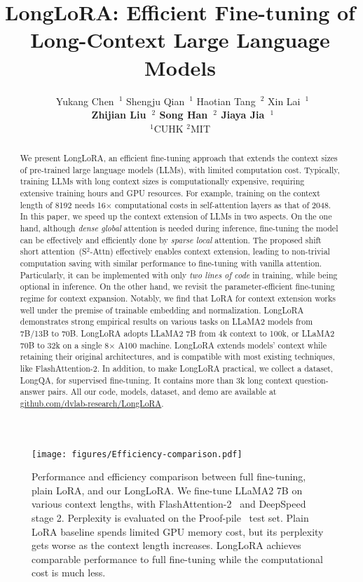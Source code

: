 \documentclass{article} %
\title{LongLoRA: Efficient Fine-tuning of Long-Context Large Language Models}
\author{%
\qquad \qquad $\,$ Yukang Chen~$^{1}$\qquad
Shengju Qian~$^{1}$\qquad
Haotian Tang~$^{2}$\qquad
Xin Lai~$^{1}$\qquad \qquad
\\[0.1cm]
\textbf{%
\qquad \qquad \, Zhijian Liu~$^{2}$\qquad
Song Han~$^{2}$\qquad
Jiaya Jia~$^{1}$
}
\\[0.2cm]
\qquad $^1$CUHK\qquad
$^2$MIT\qquad
}
\begin{document}
\maketitle
\begin{abstract}
We present LongLoRA, an efficient fine-tuning approach that extends the context sizes of pre-trained large language models (LLMs), with limited computation cost.
Typically, training LLMs with long context sizes is computationally expensive, requiring extensive training hours and GPU resources. For example, training on the context length of 8192 needs 16$\times$ computational costs in self-attention layers as that of 2048.
In this paper, we speed up the context extension of LLMs in two aspects. On the one hand, although \textit{dense global} attention is needed during inference, fine-tuning the model can be effectively and efficiently done by \textit{sparse local} attention. The proposed shift short attention~(S$^2$-Attn) effectively enables context extension, leading to non-trivial computation saving with similar performance to fine-tuning with vanilla attention. Particularly, it can be implemented with only \textit{two lines of code} in training, while being optional in inference. On the other hand, we revisit the parameter-efficient fine-tuning regime for context expansion. Notably, we find that LoRA for context extension works well under the premise of trainable embedding and normalization. LongLoRA demonstrates strong empirical results on various tasks on LLaMA2 models from 7B/13B to 70B. LongLoRA adopts LLaMA2 7B from 4k context to 100k, or LLaMA2 70B to 32k on a single 8$\times$ A100 machine. LongLoRA extends models' context while retaining their original architectures, and is compatible with most existing techniques, like FlashAttention-2. In addition, to make LongLoRA practical, we collect a dataset, LongQA, for supervised fine-tuning. It contains more than 3k long context question-answer pairs. All our code, models, dataset, and demo are available at \href{https://github.com/dvlab-research/LongLoRA}{github.com/dvlab-research/LongLoRA}.
\end{abstract}

\begin{figure*}[h]
\begin{center}
\texttt{[image: figures/Efficiency-comparison.pdf]}
\end{center}
\caption{Performance and efficiency comparison between full fine-tuning, plain LoRA, and our LongLoRA. We fine-tune LLaMA2 7B on various context lengths, with FlashAttention-2~\citep{flash-attention2} and DeepSpeed~\citep{deepspeed} stage 2. Perplexity is evaluated on the Proof-pile~\citep{proof-pile} test set. Plain LoRA baseline spends limited GPU memory cost, but its perplexity gets worse as the context length increases. LongLoRA achieves comparable performance to full fine-tuning while the computational cost is much less.}
\label{fig:efficiency-comparison}
\end{figure*}
\end{document}
